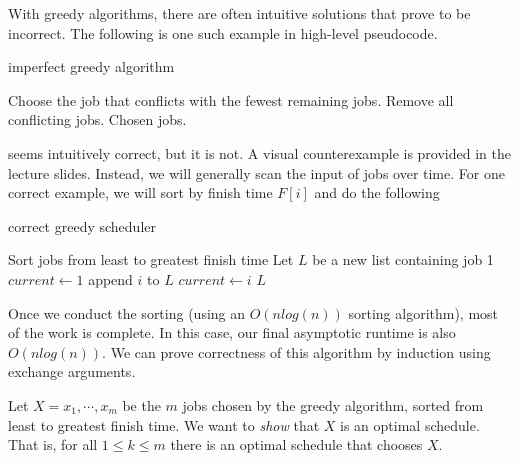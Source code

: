 \documentclass[titlepage, 12pt, leqno]{article}
\begin{document}
With greedy algorithms, there are often intuitive solutions that prove to be
incorrect. The following is one such example in high-level pseudocode.
\begin{algorithm}
\caption{imperfect greedy algorithm}
\begin{algorithmic}[1]
        \State Choose the job that conflicts with the fewest remaining jobs.
        \State Remove all conflicting jobs.
    \EndWhile
    \State \Return Chosen jobs.
\EndProcedure 
\end{algorithmic}
\end{algorithm}

 seems intuitively correct, but it is not. A visual 
counterexample is provided in the lecture slides. Instead, we will generally
scan the input of jobs over time. For one correct example, we will sort by
finish time $F[i]$ and do the following

\begin{algorithm}
\caption{correct greedy scheduler}
\begin{algorithmic}[1]
    \State Sort jobs from least to greatest finish time
    \State Let $L$ be a new list containing job 1
    \State $current \leftarrow 1$
            \State append $i$ to $L$
            \State $current \leftarrow i$
        \EndIf
    \EndFor
    \State \Return $L$
\EndProcedure 
\end{algorithmic}
\end{algorithm}

Once we conduct the sorting (using an $O(nlog(n))$ sorting algorithm), most
of the work is complete. In this case, our final asymptotic runtime is also
$O(nlog(n))$. We can prove correctness of this algorithm by induction using
exchange arguments.

Let $X = x_{1}, \cdots ,x_{m}$ be the $m$ jobs chosen by the greedy algorithm,
sorted from least to greatest finish time. We want to \textit{show} that $X$ is
an optimal schedule. That is, for all $1\le k\le m$ there is an optimal
schedule that chooses $X$.
\end{document}
